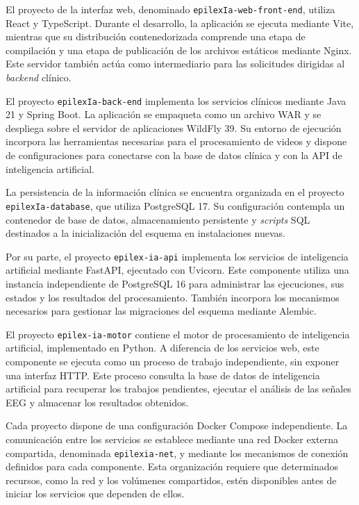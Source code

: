 El proyecto de la interfaz web, denominado
\texttt{epilexIa-web-front-end}, utiliza React y TypeScript.
Durante el desarrollo, la aplicación se ejecuta mediante Vite,
mientras que su distribución contenedorizada comprende una
etapa de compilación y una etapa de publicación de los
archivos estáticos mediante Nginx. Este servidor también
actúa como intermediario para las solicitudes dirigidas
al \textit{backend} clínico.

El proyecto \texttt{epilexIa-back-end} implementa los
servicios clínicos mediante Java 21 y Spring Boot. La
aplicación se empaqueta como un archivo WAR y se despliega
sobre el servidor de aplicaciones WildFly 39. Su entorno
de ejecución incorpora las herramientas necesarias para
el procesamiento de videos y dispone de configuraciones
para conectarse con la base de datos clínica y con la
API de inteligencia artificial.

La persistencia de la información clínica se encuentra
organizada en el proyecto \texttt{epilexIa-database},
que utiliza PostgreSQL 17. Su configuración contempla
un contenedor de base de datos, almacenamiento persistente
y \textit{scripts} SQL destinados a la inicialización del esquema
en instalaciones nuevas.

Por su parte, el proyecto \texttt{epilex-ia-api} implementa
los servicios de inteligencia artificial mediante FastAPI,
ejecutado con Uvicorn. Este componente utiliza una instancia
independiente de PostgreSQL 16 para administrar las ejecuciones,
sus estados y los resultados del procesamiento. También
incorpora los mecanismos necesarios para gestionar las
migraciones del esquema mediante Alembic.

El proyecto \texttt{epilex-ia-motor} contiene el motor de
procesamiento de inteligencia artificial, implementado
en Python. A diferencia de los servicios web, este componente
se ejecuta como un proceso de trabajo independiente, sin
exponer una interfaz HTTP. Este proceso consulta la base de datos de inteligencia artificial para
recuperar los trabajos pendientes, ejecutar el análisis
de las señales EEG y almacenar los resultados obtenidos.

Cada proyecto dispone de una configuración Docker Compose
independiente. La comunicación entre los servicios se
establece mediante una red Docker externa compartida,
denominada \texttt{epilexia-net}, y mediante los mecanismos
de conexión definidos para cada componente. Esta
organización requiere que determinados recursos, como
la red y los volúmenes compartidos, estén disponibles
antes de iniciar los servicios que dependen de ellos.

